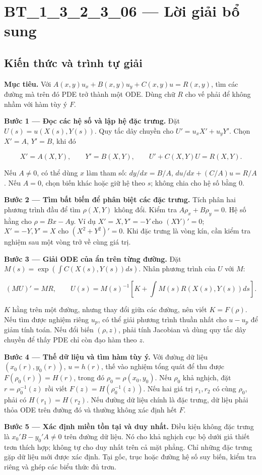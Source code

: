 \documentclass[10pt,a4paper]{article}
\begin{document}
\section*{BT\_1\_3\_2\_3\_06 — Lời giải bổ sung}
\subsection*{Kiến thức và trình tự giải}
\textbf{Mục tiêu.} Với $A(x,y)u_x+B(x,y)u_y+C(x,y)u=R(x,y)$, tìm các đường mà trên đó PDE trở thành một ODE. Dùng chữ $R$ cho vế phải để không nhầm với hàm tùy ý $F$.

\textbf{Bước 1 — Đọc các hệ số và lập hệ đặc trưng.} Đặt $U(s)=u(X(s),Y(s))$. Quy tắc dây chuyền cho $U'=u_xX'+u_yY'$. Chọn $X'=A$, $Y'=B$, khi đó

\[
X'=A(X,Y),\qquad Y'=B(X,Y),\qquad U'+C(X,Y)U=R(X,Y).
\]

Nếu $A\ne0$, có thể dùng $x$ làm tham số: $dy/dx=B/A$, $du/dx+(C/A)u=R/A$. Nếu $A=0$, chọn biến khác hoặc giữ hệ theo $s$; không chia cho hệ số bằng 0.

\textbf{Bước 2 — Tìm bất biến để phân biệt các đặc trưng.} Tích phân hai phương trình đầu để tìm $\rho(X,Y)$ không đổi. Kiểm tra $A\rho_x+B\rho_y=0$. Hệ số hằng cho $\rho=Bx-Ay$. Ví dụ $X'=X,Y'=-Y$ cho $(XY)'=0$; $X'=-Y,Y'=X$ cho $(X^2+Y^2)'=0$. Khi đặc trưng là vòng kín, cần kiểm tra nghiệm sau một vòng trở về cùng giá trị.

\textbf{Bước 3 — Giải ODE của ẩn trên từng đường.} Đặt $M(s)=\exp(\int C(X(s),Y(s))ds)$. Nhân phương trình của $U$ với $M$:

\[
(MU)'=MR,\qquad
U(s)=M(s)^{-1}\left[K+\int M(s)R(X(s),Y(s))ds\right].
\]

$K$ hằng trên một đường, nhưng thay đổi giữa các đường, nên viết $K=F(\rho)$. Nếu tìm được nghiệm riêng $u_p$, có thể giải phương trình thuần nhất cho $u-u_p$ để giảm tính toán. Nếu đổi biến $(\rho,z)$, phải tính Jacobian và dùng quy tắc dây chuyền để thấy PDE chỉ còn đạo hàm theo $z$.

\textbf{Bước 4 — Thế dữ liệu và tìm hàm tùy ý.} Với đường dữ liệu $(x_0(r),y_0(r))$, $u=h(r)$, thế vào nghiệm tổng quát để thu được $F(\rho_0(r))=H(r)$, trong đó $\rho_0=\rho(x_0,y_0)$. Nếu $\rho_0$ khả nghịch, đặt $r=\rho_0^{-1}(z)$ rồi viết $F(z)=H(\rho_0^{-1}(z))$. Nếu hai giá trị $r_1,r_2$ có cùng $\rho_0$, phải có $H(r_1)=H(r_2)$. Nếu đường dữ liệu chính là đặc trưng, dữ liệu phải thỏa ODE trên đường đó và thường không xác định hết $F$.

\textbf{Bước 5 — Xác định miền tồn tại và duy nhất.} Điều kiện không đặc trưng là $x_0'B-y_0'A\ne0$ trên đường dữ liệu. Nó cho khả nghịch cục bộ dưới giả thiết trơn thích hợp; không tự cho duy nhất trên cả mặt phẳng. Chỉ những đặc trưng gặp dữ liệu mới được xác định. Tại gốc, trục hoặc đường hệ số suy biến, kiểm tra riêng và ghép các biểu thức đủ trơn.
\end{document}
